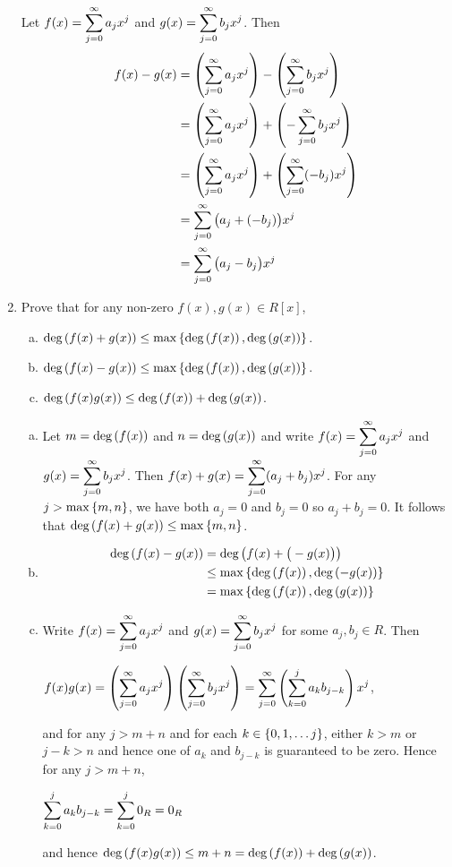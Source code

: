 \documentclass[11pt,fleqn,dvipsnames,usenames]{article}
\begin{document}
\begin{enumerate}[1.]
\solution Let $f(x) = \displaystyle\sum\limits_{j=0}^{\infty}a_{j}x^{j}$ and $g(x) = \displaystyle\sum\limits_{j=0}^{\infty}b_{j}x^{j}$.  Then
\begin{align*}
f(x) - g(x) &= \left(\displaystyle\sum\limits_{j=0}^{\infty}a_{j}x^{j}\right) - \left(\displaystyle\sum\limits_{j=0}^{\infty}b_{j}x^{j}\right)\\
&= \left(\displaystyle\sum\limits_{j=0}^{\infty}a_{j}x^{j}\right) + \left(-\displaystyle\sum\limits_{j=0}^{\infty}b_{j}x^{j}\right)\\
&= \left(\displaystyle\sum\limits_{j=0}^{\infty}a_{j}x^{j}\right) + \left(\displaystyle\sum\limits_{j=0}^{\infty}(-b_{j})x^{j}\right)\\
&= \displaystyle\sum\limits_{j=0}^{\infty}\big(a_{j} + (-b_{j})\big)x^{j}\\
&= \displaystyle\sum\limits_{j=0}^{\infty}\big(a_{j} - b_{j}\big)x^{j}\\
\end{align*}

\item Prove that for any non-zero $f(x),g(x)\in R[x]$,
\begin{enumerate}[(a)]
\item $\text{deg}\left(f(x)+g(x)\right)\leq \max\left\{\text{deg}\left(f(x)\right), \text{deg}\left(g(x)\right)\right\}$.
\item $\text{deg}\left(f(x)-g(x)\right)\leq \max\left\{\text{deg}\left(f(x)\right), \text{deg}\left(g(x)\right)\right\}$.
\item $\text{deg}\left(f(x)g(x)\right)\leq \text{deg}\left(f(x)\right) + \text{deg}\left(g(x)\right)$.
\end{enumerate}
\vsmsp

\solution
\begin{enumerate}[(a)]
\item Let $m = \text{deg}\left(f(x)\right)$ and $n = \text{deg}\left(g(x)\right)$ and write $f(x) = \displaystyle\sum\limits_{j=0}^{\infty}a_{j}x^{j}$ and $g(x) = \displaystyle\sum\limits_{j=0}^{\infty}b_{j}x^{j}$.  Then $f(x) + g(x) = \displaystyle\sum\limits_{j=0}^{\infty}(a_{j}+b_{j})x^{j}$.  For any $j > \max\left\{m,n\right\}$, we have both $a_{j} = 0$ and $b_{j} = 0$ so $a_{j} + b_{j} = 0$.  It follows that $\text{deg}\left(f(x) + g(x)\right)\leq \max\left\{m,n\right\}$.

\item 
\begin{align*}
\text{deg}\left(f(x) - g(x)\right) &= \text{deg}\left(f(x) + \big(-g(x)\big)\right)\\
&\leq \max\left\{\text{deg}\left(f(x)\right),\text{deg}\left(-g(x)\right)\right\}\\
&= \max\left\{\text{deg}\left(f(x)\right),\text{deg}\left(g(x)\right)\right\}
\end{align*}

\item Write $f(x) = \displaystyle\sum\limits_{j=0}^{\infty}a_{j}x^{j}$ and $g(x) = \displaystyle\sum\limits_{j=0}^{\infty}b_{j}x^{j}$ for some $a_{j},b_{j}\in R$.  Then
\begin{center}
$f(x)g(x) = \left(\displaystyle\sum\limits_{j=0}^{\infty}a_{j}x^{j}\right)\left(\displaystyle\sum\limits_{j=0}^{\infty}b_{j}x^{j}\right) = \displaystyle\sum\limits_{j=0}^{\infty}\left(\displaystyle\sum\limits_{k=0}^{j}a_{k}b_{j-k}\right)x^{j}$,
\end{center}
and for any $j > m + n$ and for each $k\in\left\{0,1,\ldots j\right\}$, either $k > m$ or $j-k > n$ and hence one of $a_{k}$ and $b_{j-k}$ is guaranteed to be zero.  Hence for any $j > m + n$,
\begin{center}
$\displaystyle\sum\limits_{k=0}^{j}a_{k}b_{j-k} = \displaystyle\sum\limits_{k=0}^{j}0_{R} = 0_{R}$
\end{center}
and hence $\text{deg}\left(f(x)g(x)\right)\leq m + n = \text{deg}\left(f(x)\right) + \text{deg}\left(g(x)\right)$.
\end{enumerate}


\end{enumerate}
\end{document}
